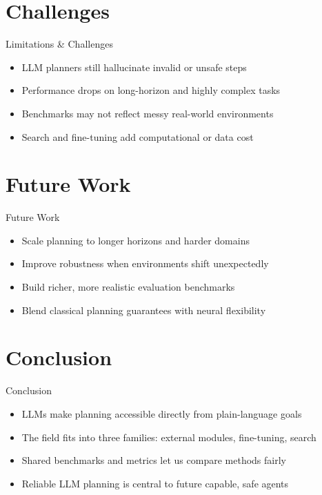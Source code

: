 \documentclass[10pt]{beamer}
\begin{document}
\section{Challenges}
\begin{frame}{Limitations \& Challenges}
\begin{itemize}
  \item LLM planners still hallucinate invalid or unsafe steps
  \item Performance drops on long-horizon and highly complex tasks
  \item Benchmarks may not reflect messy real-world environments
  \item Search and fine-tuning add computational or data cost
\end{itemize}
\end{frame}

\section{Future Work}
\begin{frame}{Future Work}
\begin{itemize}
  \item Scale planning to longer horizons and harder domains
  \item Improve robustness when environments shift unexpectedly
  \item Build richer, more realistic evaluation benchmarks
  \item Blend classical planning guarantees with neural flexibility
\end{itemize}
\end{frame}

\section{Conclusion}
\begin{frame}{Conclusion}
\begin{itemize}
  \item LLMs make planning accessible directly from plain-language goals
  \item The field fits into three families: external modules, fine-tuning, search
  \item Shared benchmarks and metrics let us compare methods fairly
  \item Reliable LLM planning is central to future capable, safe agents
\end{itemize}
\end{frame}
\end{document}
